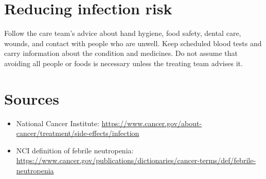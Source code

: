 \section*{Reducing infection risk}
Follow the care team’s advice about hand hygiene, food safety, dental care, wounds, and contact with people who are unwell. Keep scheduled blood tests and carry information about the condition and medicines. Do not assume that avoiding all people or foods is necessary unless the treating team advises it.

\section*{Sources}
\begin{itemize}
\item National Cancer Institute: \url{https://www.cancer.gov/about-cancer/treatment/side-effects/infection}
\item NCI definition of febrile neutropenia: \url{https://www.cancer.gov/publications/dictionaries/cancer-terms/def/febrile-neutropenia}
\end{itemize}
